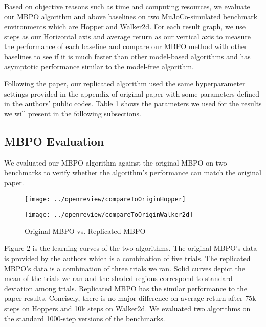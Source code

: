 Based on objective reasons such as time and computing resources, we evaluate our MBPO algorithm and above baselines on two MuJoCo-simulated benchmark environments which are Hopper and Walker2d. For each result graph, we use steps as our Horizontal axis and average return as our vertical axis to measure the performance of each baseline and compare our MBPO method with other baselines to see if it is much faster than other model-based algorithms and has asymptotic performance similar to the model-free algorithm.

Following the paper, our replicated algorithm used the same hyperparameter settings provided in the appendix of original paper with some parameters defined in the authors' public codes. Table 1 shows the parameters we used for the results we will present in the following subsections.

\subsection{MBPO Evaluation}
We evaluated our MBPO algorithm against the original MBPO on two benchmarks to verify whether the algorithm's performance can match the original paper.  

\begin{figure}[h]
\centering
\begin{minipage}[t]{0.48\textwidth}
\centering
\texttt{[image: ../openreview/compareToOriginHopper]}
\end{minipage}
\begin{minipage}[t]{0.48\textwidth}
\centering
\texttt{[image: ../openreview/compareToOriginWalker2d]}
\end{minipage}
\caption{Original MBPO vs. Replicated MBPO}
\end{figure}

Figure 2 is the learning curves of the two algorithms. The original MBPO's data is provided by the authors which is a combination of five trials. The replicated MBPO's data is a combination of three trials we ran. Solid curves depict the mean of the trials we ran and the shaded regions correspond to standard deviation among trials. Replicated MBPO has the similar performance to the paper results. Concisely, there is no major difference on average return after 75k steps on Hoppers and 10k steps on Walker2d. We evaluated two algorithms on the standard 1000-step versions of the benchmarks.


